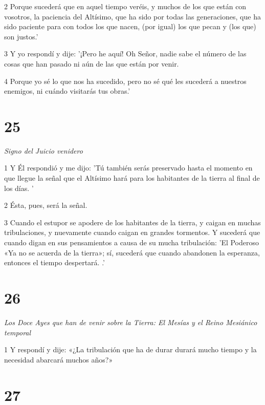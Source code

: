 \par 2 Porque sucederá que en aquel tiempo veréis, y muchos de los que están con vosotros, la paciencia del Altísimo, que ha sido por todas las generaciones, que ha sido paciente para con todos los que nacen, (por igual) los que pecan y (los que) son justos.'

\par 3 Y yo respondí y dije: '¡Pero he aquí! Oh Señor, nadie sabe el número de las cosas que han pasado ni aún de las que están por venir.

\par 4 Porque yo sé lo que nos ha sucedido, pero no sé qué les sucederá a nuestros enemigos, ni cuándo visitarás tus obras.'

\chapter{25}

\par \textit{Signo del Juicio venidero}

\par 1 Y Él respondió y me dijo: 'Tú también serás preservado hasta el momento en que llegue la señal que el Altísimo hará para los habitantes de la tierra al final de los días. '

\par 2 Ésta, pues, será la señal.

\par 3 Cuando el estupor se apodere de los habitantes de la tierra, y caigan en muchas tribulaciones, y nuevamente cuando caigan en grandes tormentos. Y sucederá que cuando digan en sus pensamientos a causa de su mucha tribulación: 'El Poderoso «Ya no se acuerda de la tierra»; sí, sucederá que cuando abandonen la esperanza, entonces el tiempo despertará. .'

\chapter{26}

\par \textit{Los Doce Ayes que han de venir sobre la Tierra: El Mesías y el Reino Mesiánico temporal}

\par 1 Y respondí y dije: «¿La tribulación que ha de durar durará mucho tiempo y la necesidad abarcará muchos años?»

\chapter{27}

